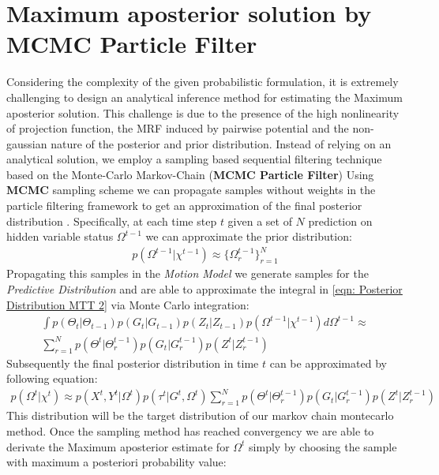 \newpage
\section{Maximum aposterior solution by MCMC Particle Filter}
Considering the complexity of the given probabilistic formulation, it is extremely challenging to design an analytical inference method for estimating the Maximum aposterior solution. This challenge is due to the presence of the high nonlinearity of projection function, the MRF induced by pairwise potential and the non-gaussian nature of the posterior and prior distribution. 
Instead of relying on an analytical solution, we employ a sampling based sequential filtering technique based on the Monte-Carlo Markov-Chain (\textbf{MCMC Particle Filter})
Using \textbf{MCMC} sampling scheme we can propagate samples without weights in the particle filtering framework to get an approximation of the final posterior distribution .
Specifically, at each time step $t$ given a set of $N$ prediction on hidden variable status $\Omega^{t-1}$  we can approximate the prior distribution:
\begin{eqnarray} \label{eqn: Predictive Approximation}
p(\Omega^{t-1} |\chi^{t-1}) \approx \{ \Omega_r^{t-1} \}_{r=1}^N
\end{eqnarray}
Propagating this samples in the \textit{Motion Model} we generate samples for the \textit{Predictive Distribution} and are able to approximate the integral in \ref{eqn: Posterior Distribution MTT 2} via Monte Carlo integration:\\
\begin{eqnarray} \label{eqn: MonteCarlo Approx. Predictive}	
\int p(\Theta_{t} |\Theta_{t-1}) p(G_t |G_{t−1}) p(Z_t |Z_{t−1})p(\Omega^{t-1}|\chi^{t-1}) d\Omega^{t-1} \approx \\ \nonumber
\sum_{r=1}^{N} p(\Theta^{t} | \Theta^{t-1}_r) p(G_t |G^{t-1}_r) p(Z^t |Z^{t-1}_r) 
\end{eqnarray}
Subsequently the final posterior distribution in time $t$ can be approximated by following equation:
\begin{eqnarray} \label{eqn: Posterior Distribution MTT3}
p(\Omega^{t} |\chi^{t}) \approx  p(X^{t}, Y^t |\Omega^{t}) p(\tau^{t} | G^t ,\Omega^{t}) 
\sum_{r=1}^{N} p(\Theta^{t} | \Theta^{t-1}_r) p(G_t |G^{t-1}_r) p(Z^t |Z^{t-1}_r)
\end{eqnarray}
This distribution will be the target distribution of our markov chain montecarlo method.
Once the sampling method has reached convergency we are able to derivate the Maximum aposterior estimate for $\Omega^{t}$ simply by choosing the sample with maximum a posteriori probability value: \\
